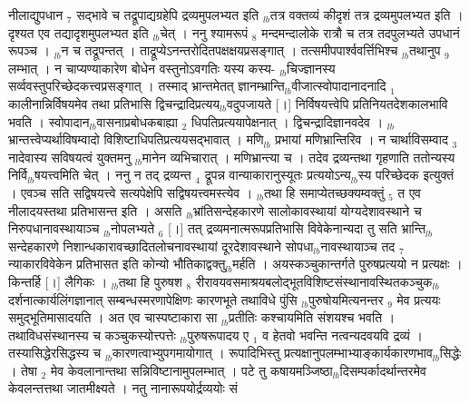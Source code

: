 \documentclass[article,12pt,a4paper]{memoir}%
\begin{document}
नीलाद्युपधान {\tiny $_{7}$} सद्भावे च तद्रूपाद्यग्रहेपि द्रव्यमुपलभ्यत इति {\tiny $_{lb}$}तत्र वक्तव्यं कीदृशं तत्र द्रव्यमुपलभ्यत इति । दृश्यत एव तद्यादृशमुपलभ्यत इति {\tiny $_{lb}$}चेत् । ननु श्यामरूपं {\tiny $_{8}$} मन्दमन्दालोके रात्रौ च तत्र तदपुलभ्यते उपधानं रूपञ्च । {\tiny $_{lb}$}न च तद्रूपन्तत् । ताद्रूप्येऽनन्तरोदितपक्षक्षयप्रसङ्गात् । तत्समीपपार्श्ववर्त्तिभिश्च {\tiny $_{lb}$}तथानुप {\tiny $_{9}$} \leavevmode{} लम्भात् । न चाप्यण्याकारेण बोधेन वस्तुनोऽवगतिः यस्य कस्य- {\tiny $_{lb}$}चिज्ज्ञानस्य सर्व्ववस्तुपरिच्छेदकत्त्वप्रसङ्गात् । तस्माद् भ्रान्तमेतत् ज्ञानम्भ्रान्ति{\tiny $_{lb}$}वीजात्स्वोपादानादनादि {\tiny $_{1}$} कालीनान्निर्विषयमेव तथा प्रतिभासि द्विचन्द्रादिप्रत्यय{\tiny $_{lb}$}वदुपजायते [।] निर्विषयत्त्वेपि प्रतिनियतदेशकालभावि भवति । स्वोपादान{\tiny $_{lb}$}वासनाप्रबोधकबाह्या {\tiny $_{2}$} धिपतिप्रत्ययापेक्षनात् । द्विचन्द्रादिज्ञानवदेव । {\tiny $_{lb}$}भ्रान्तत्त्वेप्यर्थाविषम्वादो विशिष्टाधिपतिप्रत्ययसद्भावात् । मणि{\tiny $_{lb}$} \leavevmode{} प्रभायां मणिभ्रान्तिरिव । न चार्थाविसम्वाद {\tiny $_{3}$} नादेवास्य सविषयत्वं युक्तमनु {\tiny $_{lb}$}मानेन व्यभिचारात् । मणिभ्रान्त्या च । तदेव द्रव्यन्तथा गृहणाति ततोन्यस्य निर्वि{\tiny $_{lb}$}षयत्त्वमिति चेत् । ननु न तद् द्रव्यन्त {\tiny $_{4}$} द्रूपन्न वान्याकारानुस्यूतः प्रत्ययोऽन्य{\tiny $_{lb}$}स्य परिच्छेदक इत्युक्तं । एवञ्च सति सद्विषयत्त्वे सत्यपेक्षेपि सद्विषयत्त्वमस्त्येव । {\tiny $_{lb}$}तथा हि समाप्येतच्छक्यम्वक्तुं {\tiny $_{5}$} त एव नीलादयस्तथा प्रतिभासन्त इति । असति {\tiny $_{lb}$}भ्रांतिसन्देहकारणे सालोकावस्थायां योग्यदेशावस्थाने च निरुपधानावस्थायाञ्च {\tiny $_{lb}$}नोपलभ्यते {\tiny $_{6}$} [।] तत् द्रव्यमनात्मरूपप्रतिभासि विवेकेनान्यदा तु सति भ्रान्ति{\tiny $_{lb}$}सन्देहकारणे निशान्धकारावच्छादितलोचनावस्थायां दूरदेशावस्थाने सोपधा{\tiny $_{lb}$}नावस्थायाञ्च तद {\tiny $_{7}$} न्याकारविवेकेन प्रतिभासत इति कोन्यो भौतिकाद्वक्तु{\tiny $_{lb}$}मर्हति । अयस्कञ्चुकान्तर्गते पुरुषप्रत्ययो न प्रत्यक्षः । किन्तर्हि [।] लैगिकः । {\tiny $_{lb}$}तथा हि पुरुषश {\tiny $_{8}$} रीरावयवसमाश्रयबलोद्भूतविशिष्टसंस्थानावस्थितकञ्चुक{\tiny $_{lb}$}दर्शनात्कार्यलिंगज्ञानात् सम्बन्धस्मरणापेक्षिणः कारणभूते तथाविधे पुंसि {\tiny $_{lb}$}पुरुषोयमित्यनन्तर {\tiny $_{9}$} \leavevmode{} मेव प्रत्ययः समुद्भूतिमासादयति । अत एव चास्पष्टाकारा सा {\tiny $_{lb}$}प्रतीतिः कश्चायमिति संशयश्च भवति । तथाविधसंस्थानस्य च कञ्चुकस्योत्त्पत्तेः {\tiny $_{lb}$}पुरुषरूपादय ए {\tiny $_{1}$} व हेतवो भवन्ति नत्वन्यदवयवि द्रव्यं । तस्यासिद्धेरसिद्धस्य च {\tiny $_{lb}$}कारणत्वाभ्युपगमायोगात् । रूपादिभिस्तु प्रत्यक्षानुपलम्भाभ्याङ्कार्यकारणभाव{\tiny $_{lb}$}सिद्धेः । तेषा {\tiny $_{2}$} मेव केवलानान्तथा सन्निविष्टानामुपलम्भात् । पटे तु कषायमञ्जिष्ठा{\tiny $_{lb}$}दिसम्पर्कादर्थान्तरमेव केवलन्तत्तथा जातमीक्ष्यते । नतु नानारूपयोर्द्रव्ययोः सं 
\end{document}

